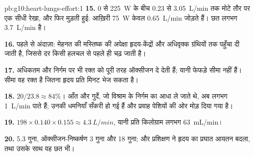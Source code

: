 \begin{solution}{pb:g10:heart-lungs-effort:1}
\textbf{15.} 0 से \qty{225}{W} के बीच \num{0.23} से \qty{3.05}{L/min}
तक मोटे तौर पर एक सीधी रेखा, और फिर मुड़ती हुई: आख़िरी \qty{75}{W} केवल
\qty{0.65}{L/min} जोड़ते हैं। छत लगभग \qty{3.7}{L/min} है।

\textbf{16.} पहले से अंदाज़ा: मेहनत की मस्तिष्क की अपेक्षा हृदय-केंद्रों
और अधिवृक्क ग्रंथियों तक पहुँचा दी जाती है, जिससे दर किसी हलचल से पहले ही
चढ़ जाती है।

\textbf{17.}  अधिकतम  और निर्गम पर भी रक्त को पूरी तरह
ऑक्सीजन दे देती हैं; यानी फेफड़े सीमा नहीं हैं। सीमा वह रक्त है जितना
हृदय प्रति मिनट भेज सकता है।

\textbf{18.} $20/23.8 \approx 84\%$। आँत और गुर्दे, जो विश्राम के निर्गम
का आधा ले जाते थे, अब लगभग \qty{1}{L/min} पाते हैं; उनकी धमनियाँ सँकरी हो
गई हैं और प्रवाह पेशियों की ओर मोड़ दिया गया है।

\textbf{19.} $198 \times 0.140 \times 0.155 \approx \qty{4.3}{L/min}$,
यानी प्रति किलोग्राम लगभग \qty{63}{mL/min}।

\textbf{20.}  5.3 गुना, ऑक्सीजन-निष्कर्षण 3 गुना और  18
गुना; और प्रशिक्षण ने हृदय का प्रघात आयतन बदला, तथा उसके साथ वह छत भी।
\end{solution}
